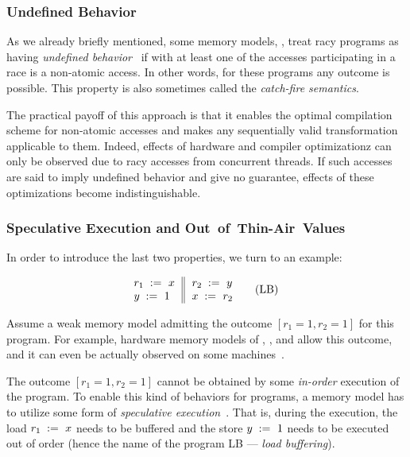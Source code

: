 \subsubsection{Undefined Behavior}
\label{sec:background:ub}

As we already briefly mentioned, some memory models, 
\eg \CPP, treat racy programs as having 
\emph{undefined behavior}~\cite{Boehm-Adve:PLDI08}
if with at least one of the accesses participating 
in a race is a non-atomic access. 
In other words, for these programs any outcome is possible. 
This property is also sometimes called the \emph{catch-fire semantics}.
  
The practical payoff of this approach  
is that it enables the optimal compilation scheme 
for non-atomic accesses and makes any sequentially valid 
transformation applicable to them.  
Indeed, effects of hardware and compiler 
optimizationz can only be observed due to racy accesses
from concurrent threads. If such accesses are said 
to imply undefined behavior and give no guarantee, 
effects of these optimizations become indistinguishable.

\subsubsection{Speculative Execution and Out~of~Thin-Air~Values}
\label{sec:background:oota}

In order to introduce the last two properties, we turn to an example: 

\begin{equation*}
\inarrII{
  \readInst{}{r_1}{x}     \\
  \writeInst{}{y}{1}      \\
}{
  \readInst{}{r_2}{y}     \\
  \writeInst{}{x}{r_2}    \\
}
\tag{LB}\label{ex:lb}
\end{equation*}

Assume a weak memory model admitting 
the outcome ${[r_1=1, r_2=1]}$ for this program.
For example, hardware memory models of 
, , and \POWER
allow this outcome, and it can even be 
actually observed on some  
machines~\cite{Maranget-al:Tutorial2012}.

The outcome ${[r_1=1, r_2=1]}$ cannot be obtained by some 
\emph{in-order} execution of the program. 
To enable this kind of behaviors for programs, 
a memory model has to utilize some form of 
\emph{speculative execution}~\cite{Boudol-Petri:ESOP10, Boehm-Demsky:MSPC14}.
That is, during the execution, the load $r_1\;:=_{}\;x$
needs to be buffered and the store $y\;:=_{}\;1$ 
needs to be executed out of order
(hence the name of the program LB --- \emph{load buffering}).

